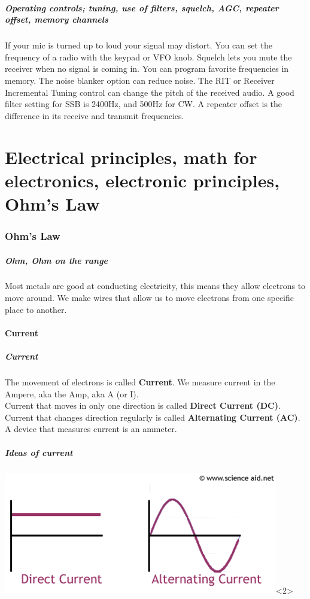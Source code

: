 \documentclass[10pt, handout]{beamer}
\begin{document}
\begin{frame}
\frametitle{Operating controls; tuning, use of filters, squelch, AGC, repeater offset, memory channels}
If your mic is turned up to loud your signal may distort. You can set the frequency of a radio with the keypad or VFO knob. Squelch lets you mute the receiver when no signal is coming in. You can program favorite frequencies in memory. The noise blanker option can reduce noise. The RIT or Receiver Incremental Tuning control can change the pitch of the received audio. A good filter setting for SSB is 2400Hz, and 500Hz for CW. A repeater offset is the difference in its receive and transmit frequencies.
\end{frame}


\part{Electrical principles, math for electronics, electronic principles, Ohm's Law}

\section{Ohm's Law}

\begin{frame}
\frametitle{Ohm, Ohm on the range}
Most metals are good at conducting electricity, this means they allow electrons to move around. We make wires that allow us to move electrons from one specific place to another.
\end{frame}

\subsection{Current}

\begin{frame}
\frametitle{Current}
The movement of electrons is called \textbf{Current}. We measure current in the Ampere, aka the Amp, aka A (or I).\\
Current that moves in only one direction is called \textbf{Direct Current (DC)}. Current that changes direction regularly is called \textbf{Alternating Current (AC)}.\\
A device that measures current is an ammeter.
\end{frame}

\begin{frame}
\frametitle{Ideas of current}
\begin{center}
\includegraphics[width=\textwidth]{acdc.png}<2>
\end{center}
\end{frame}
\end{document}
